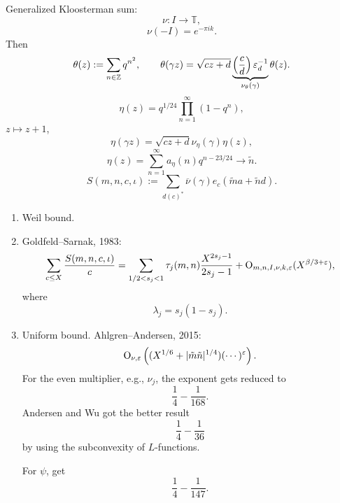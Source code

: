 \documentclass[reqno]{amsart} 
\begin{document}
Generalized Kloosterman sum:
\begin{equation*}
  \nu : I \rightarrow \mathbb{T},
\end{equation*}
\begin{equation*}
  \nu(-I) = e^{- \pi i k}.
\end{equation*}
Then
\begin{equation*}
  \theta (z) := \sum_{n \in \mathbb{Z} } q^{n^2 },
  \qquad
  \theta (\gamma z) = \sqrt{c z + d }
  \underbrace
  {
    \left( \frac{c}{d} \right)  \varepsilon_d^{-1}
  }_{
    \nu_\theta (\gamma)
  }
  \theta (z) .
\end{equation*}
\begin{equation*}
  \eta (z) = q^{1/24} \prod_{n = 1 }^\infty (1  - q^n ),
\end{equation*}
$z \mapsto z + 1$,
\begin{equation*}
  \eta (\gamma z ) = \sqrt{c z + d} \nu_\eta (\gamma) \eta (z),
\end{equation*}
\begin{equation*}
  \eta (z) = \sum_{n = 1 }^\infty a_\eta (n) q^{n - 23/24} \rightarrow \tilde{n}.
\end{equation*}
\begin{equation*}
  S (m, n, c, \iota ) := \sum_{d (c)^*} \overline{\nu } (\gamma) e_c (\tilde{m} a + \tilde{n} d).
\end{equation*}
\begin{enumerate}
\item Weil bound.
\item Goldfeld--Sarnak, 1983:
  \begin{equation*}
    \sum_{c \leq X } \frac{S (m, n, c, \iota )}{c}
    =
    \sum_{1/2 < s_j < 1}
    \tau_j (m, n)
    \frac{X^{2 s_j - 1 }}{ 2 s_j - 1 }
    + \operatorname{O}_{m, n, I, \nu, k, \varepsilon } (X^{\beta / 3 + \varepsilon }),
  \end{equation*}
  where
  \begin{equation*}
    \lambda_j = s_j (1 - s_j ).
  \end{equation*}
\item Uniform bound.  Ahlgren--Andersen, 2015:
  \begin{equation*}
    \operatorname{O}_{\nu, \varepsilon } \left( (X^{1/6} + \lvert \tilde{m} \tilde{n} \rvert^{1/4}) (\dotsb )^\varepsilon  \right).
  \end{equation*}
  For the even multiplier, e.g., $\nu_j$, the exponent gets reduced to
  \begin{equation}\label{eqn:d1bca4ee387e}
    \frac{1}{4} - \frac{1}{168}.
  \end{equation}
  Andersen and Wu got the better result
  \begin{equation}\label{eqn:d1bca4f2c062}
    \frac{1}{4} - \frac{1}{36}
  \end{equation}
  by using the subconvexity of $L$-functions.
  
  For $\psi$, get
\begin{equation}\label{eqn:d1bca4ee432a}
\frac{1}{4} - \frac{1}{147}.
\end{equation}  

\end{enumerate}
\end{document}
